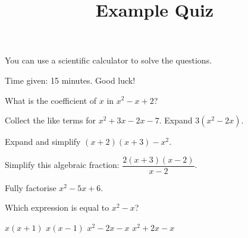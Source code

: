 \documentclass{source/quiz-exam}
\title{Example Quiz}
\begin{document}
\maketitle

You can use a scientific calculator to solve the questions.

Time given: 15 minutes.
Good luck!

\begin{questions}

\question What is the coefficient of $x$ in $x^2 - x + 2$?

\question[2] Collect the like terms for $x^2 + 3x - 2x - 7$.
\question[2] Expand $3(x^2-2x)$. \droppoints

\question[4] Expand and simplify $(x+2)(x+3)-x^2$. \droppoints
\vspace{2cm}

\question[4] Simplify this algebraic fraction: $\dfrac{2(x+3)(x-2)}{x-2}$. \droppoints
{}

\question[4] Fully factorise $x^2 - 5x + 6$. \droppoints
{}

\newpage

\question[1] Which expression is equal to $x^2 - x$?
\begin{choices}
    \choice $x(x+1)$
    \choice $x(x-1)$
    \choice $x^2 - 2x - x$
    \choice $x^2 + 2x - x$
\end{choices}
\vspace{1cm}


\end{questions}
\end{document}
